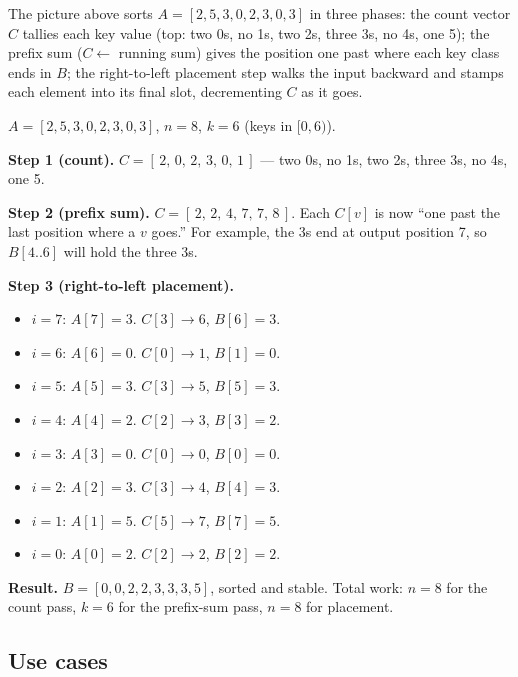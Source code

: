 \documentclass[11pt]{article}
\begin{document}
The picture above sorts $A = [2, 5, 3, 0, 2, 3, 0, 3]$ in three
phases: the count vector $C$ tallies each key value (top: two
0s, no 1s, two 2s, three 3s, no 4s, one 5); the prefix sum
($C \leftarrow$ running sum) gives the position one past where
each key class ends in $B$; the right-to-left placement step
walks the input backward and stamps each element into its
final slot, decrementing $C$ as it goes.

\begin{examplebox}
$A = [2, 5, 3, 0, 2, 3, 0, 3]$, $n = 8$, $k = 6$ (keys in $[0, 6)$).

\textbf{Step 1 (count).}
$C = [\,2,\,0,\,2,\,3,\,0,\,1\,]$ --- two 0s, no 1s, two 2s, three
3s, no 4s, one 5.

\textbf{Step 2 (prefix sum).}
$C = [\,2,\,2,\,4,\,7,\,7,\,8\,]$. Each $C[v]$ is now ``one past
the last position where a $v$ goes.'' For example, the 3s end at
output position 7, so $B[4..6]$ will hold the three 3s.

\textbf{Step 3 (right-to-left placement).}
\begin{itemize}[leftmargin=*]
    \item $i = 7$: $A[7] = 3$. $C[3] \to 6$, $B[6] = 3$.
    \item $i = 6$: $A[6] = 0$. $C[0] \to 1$, $B[1] = 0$.
    \item $i = 5$: $A[5] = 3$. $C[3] \to 5$, $B[5] = 3$.
    \item $i = 4$: $A[4] = 2$. $C[2] \to 3$, $B[3] = 2$.
    \item $i = 3$: $A[3] = 0$. $C[0] \to 0$, $B[0] = 0$.
    \item $i = 2$: $A[2] = 3$. $C[3] \to 4$, $B[4] = 3$.
    \item $i = 1$: $A[1] = 5$. $C[5] \to 7$, $B[7] = 5$.
    \item $i = 0$: $A[0] = 2$. $C[2] \to 2$, $B[2] = 2$.
\end{itemize}

\textbf{Result.} $B = [0, 0, 2, 2, 3, 3, 3, 5]$, sorted and
stable. Total work: $n = 8$ for the count pass, $k = 6$ for the
prefix-sum pass, $n = 8$ for placement.
\end{examplebox}

\subsection*{Use cases}
\end{document}
